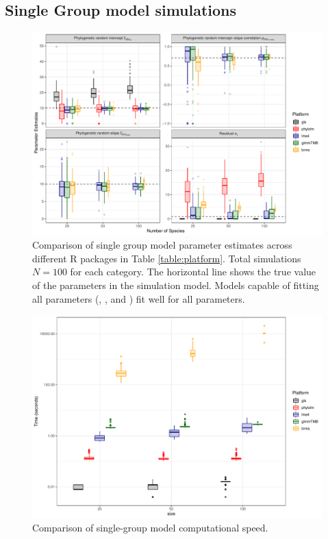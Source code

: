 \documentclass[12pt]{article}
\begin{document}
\subsection*{Single Group model simulations}

\begin{center}
\begin{figure}[H]
  \includegraphics[scale=0.7]{./figure/ssplot.pdf}
  \caption{Comparison of single group model parameter estimates across different R packages in Table \ref{table:platform}. Total simulations $N=100$ for each category. The horizontal line shows the true value of the parameters in the simulation model. Models capable of fitting all parameters (,  , and ) fit well for all parameters.
}
\label{ssplot}
\end{figure}
\end{center}
\begin{center}
\begin{figure}[H]
  \includegraphics[scale=0.7]{./figure/sstime.pdf}
  \caption{Comparison of single-group model computational speed.}
\label{ssplot_speed}
\end{figure}
\end{center}
\end{document}
